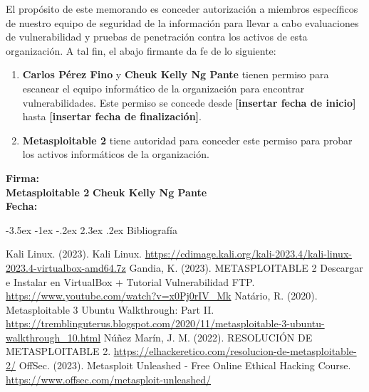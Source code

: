 \documentclass[11pt]{report}
\makeatletter
\renewcommand\chapter{\@startsection{chapter}{0}{\z@}%
    {-3.5ex \@plus -1ex \@minus -.2ex}%
    {2.3ex \@plus.2ex}%
    {\normalfont\Large\bfseries}}
\makeatother
\begin{document}
El propósito de este memorando es conceder autorización a miembros específicos de nuestro equipo de seguridad de la información para llevar a cabo evaluaciones de vulnerabilidad y pruebas de penetración contra los activos de esta organización. A tal fin, el abajo firmante da fe de lo siguiente:
\begin{enumerate}
    \item \textbf{Carlos Pérez Fino} y \textbf{Cheuk Kelly Ng Pante} tienen permiso para escanear el equipo informático de la organización para encontrar vulnerabilidades. Este permiso se concede desde \textbf{[insertar fecha de inicio]} hasta \textbf{[insertar fecha de finalización]}.
    \item \textbf{Metasploitable 2} tiene autoridad para conceder este permiso para probar los activos informáticos de la organización.
\end{enumerate}

\textbf{Firma:} \underline{\hspace{5cm}} \hspace{1cm} \underline{\hspace{5cm}} \\
\textbf{Metasploitable 2} \hspace{4.2cm} \textbf{Cheuk Kelly Ng Pante} \\
\textbf{Fecha:} \underline{\hspace{5cm}} \hspace{1cm} \underline{\hspace{5cm}}

\newpage

\chapter{Bibliografía} %
\begin{thebibliography}{99}
   Kali Linux. (2023). Kali Linux. \url{https://cdimage.kali.org/kali-2023.4/kali-linux-2023.4-virtualbox-amd64.7z}
   Gandia, K. (2023). METASPLOITABLE 2 Descargar e Instalar en VirtualBox + Tutorial Vulnerabilidad FTP. \url{https://www.youtube.com/watch?v=x0Pj0rIV_Mk}
   Natário, R. (2020). Metasploitable 3 Ubuntu Walkthrough: Part II. \url{https://tremblinguterus.blogspot.com/2020/11/metasploitable-3-ubuntu-walkthrough_10.html}
   Núñez Marín, J. M. (2022). RESOLUCIÓN DE METASPLOITABLE 2. \url{https://elhackeretico.com/resolucion-de-metasploitable-2/}
   OffSec. (2023). Metasploit Unleashed - Free Online Ethical Hacking Course. \url{https://www.offsec.com/metasploit-unleashed/}
\end{thebibliography}
\end{document}

